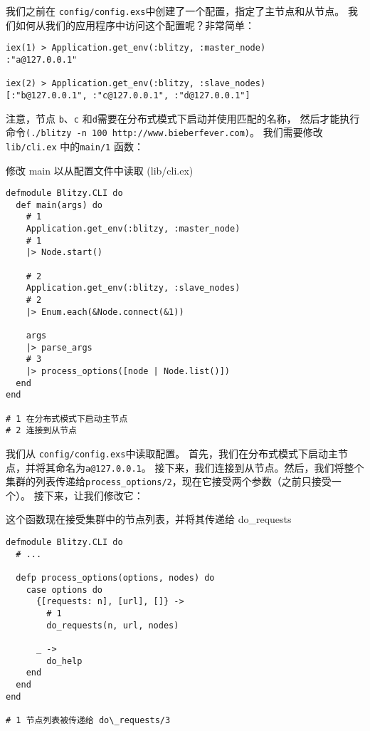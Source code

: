 我们之前在 \texttt{config/config.exs}中创建了一个配置，指定了主节点和从节点。
我们如何从我们的应用程序中访问这个配置呢？非常简单：

\begin{code}{}
\begin{verbatim}
iex(1) > Application.get_env(:blitzy, :master_node)
:"a@127.0.0.1"

iex(2) > Application.get_env(:blitzy, :slave_nodes)
[:"b@127.0.0.1", :"c@127.0.0.1", :"d@127.0.0.1"]
\end{verbatim}
\end{code}

注意，节点 \texttt{b}、\texttt{c} 和\texttt{d}需要在分布式模式下启动并使用匹配的名称，
然后才能执行命令\texttt{(./blitzy -n 100 http://www.bieberfever.com)}。
我们需要修改\texttt{lib/cli.ex} 中的\texttt{main/1} 函数：

\begin{code}{修改 main 以从配置文件中读取 (lib/cli.ex)}

\begin{verbatim}
defmodule Blitzy.CLI do
  def main(args) do
    # 1
    Application.get_env(:blitzy, :master_node)
    # 1
    |> Node.start()

    # 2
    Application.get_env(:blitzy, :slave_nodes)
    # 2
    |> Enum.each(&Node.connect(&1))

    args
    |> parse_args
    # 3
    |> process_options([node | Node.list()])
  end
end

# 1 在分布式模式下启动主节点
# 2 连接到从节点
\end{verbatim}
\end{code}


我们从 \texttt{config/config.exs}中读取配置。
首先，我们在分布式模式下启动主节点，并将其命名为\texttt{a@127.0.0.1}。
接下来，我们连接到从节点。然后，我们将整个集群的列表传递给\texttt{process\_options/2}，现在它接受两个参数（之前只接受一个）。
接下来，让我们修改它：

\begin{code}{这个函数现在接受集群中的节点列表，并将其传递给 do\_requests}

\begin{verbatim}
defmodule Blitzy.CLI do
  # ...

  defp process_options(options, nodes) do
    case options do
      {[requests: n], [url], []} ->
        # 1
        do_requests(n, url, nodes)

      _ ->
        do_help
    end
  end
end

# 1 节点列表被传递给 do\_requests/3
\end{verbatim}
\end{code}

